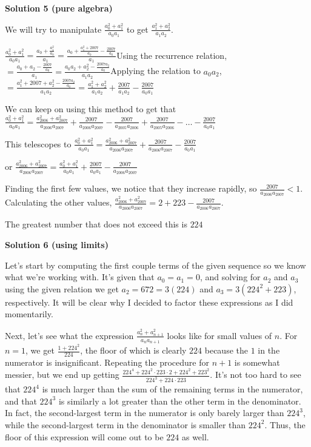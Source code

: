\begin{enumerate}
\textbf{Solution 5 (pure algebra)}

We will try to manipulate $\frac{a_0^2+a_1^2}{a_0a_1}$ to get $\frac{a_1^2+a_2^2}{a_1a_2}$. 

 $\frac{a_0^2+a_1^2}{a_0a_1} = \frac{a_0+\frac{a_1^2}{a_0}}{a_1} = \frac{a_0+\frac{a_1^2+2007}{a_0}-\frac{2007}{a_0}}{a_1}$Using the recurrence relation, $= \frac{a_0+a_2-\frac{2007}{a_0}}{a_1}  = \frac{a_0a_2+a_2^2-\frac{2007a_2}{a_0}}{a_1a_2}$Applying the relation to $a_0a_2$, $= \frac{a_1^2+2007+a_2^2-\frac{2007a_2}{a_0}}{a_1a_2} = \frac{a_1^2+a_2^2}{a_1a_2}+\frac{2007}{a_1a_2}-\frac{2007}{a_0a_1}$

 We can keep on using this method to get that $\frac{a_0^2+a_1^2}{a_0a_1} = \frac{a_{2006}^2+a_{2007}^2}{a_{2006}a_{2007}}+\frac{2007}{a_{2006}a_{2007}}-\frac{2007}{a_{2005}a_{2006}}+\frac{2007}{a_{2005}a_{2006}}-\ldots-\frac{2007}{a_{0}a_{1}}$

 This telescopes to $\frac{a_0^2+a_1^2}{a_0a_1} = \frac{a_{2006}^2+a_{2007}^2}{a_{2006}a_{2007}}+\frac{2007}{a_{2006}a_{2007}}-\frac{2007}{a_{0}a_{1}}$

 or $\frac{a_{2006}^2+a_{2007}^2}{a_{2006}a_{2007}} = \frac{a_0^2+a_1^2}{a_0a_1}+\frac{2007}{a_{0}a_{1}}-\frac{2007}{a_{2006}a_{2007}}$

 Finding the first few values, we notice that they increase rapidly, so $\frac{2007}{a_{2006}a_{2007}} < 1$. Calculating the other values, $\frac{a_{2006}^2+a_{2007}^2}{a_{2006}a_{2007}} = 2+223-\frac{2007}{a_{2006}a_{2007}}$.

 The greatest number that does not exceed this is $\boxed{224}$




\textbf{Solution 6 (using limits)}

Let's start by computing the first couple terms of the given sequence so we know what we're working with. It's given that $a_0 = a_1 = 0$, and solving for $a_2$ and $a_3$ using the given relation we get $a_2 = 672 = 3(224)$ and $a_3 = 3(224^{2} + 223)$, respectively. It will be clear why I decided to factor these expressions as I did momentarily. 

 Next, let's see what the expression $\frac{a_{n}^{2}+a_{n + 1}^{2}}{a_{n}a_{n + 1}}$ looks like for small values of $n$. For $n = 1$, we get $\frac{1 + 224^2}{224}$, the floor of which is clearly $224$ because the $1$ in the numerator is insignificant. Repeating the procedure for $n + 1$ is somewhat messier, but we end up getting $\frac{224^4 + 224^2\cdot223\cdot2 + 224^2 + 223^2}{224^3 + 224\cdot223}$. It's not too hard to see that $224^4$ is much larger than the sum of the remaining terms in the numerator, and that $224^3$ is similarly a lot greater than the other term in the denominator. In fact, the second-largest term in the numerator is only barely larger than $224^3$, while the second-largest term in the denominator is smaller than $224^2$. Thus, the floor of this expression will come out to be $224$ as well.


\end{enumerate}
